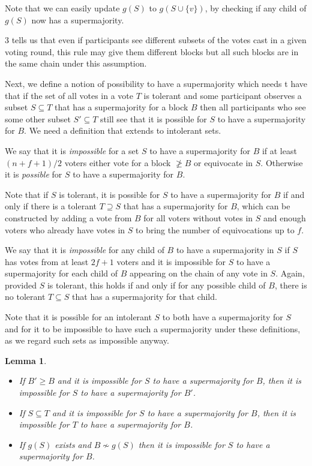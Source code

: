 \documentclass{article}
\newtheorem{lemma}[theorem]{Lemma}
\begin{document}
Note that we can easily update $g(S)$ to $g(S \cup \{v\})$, by checking if any child of $g(S)$ now has a supermajority.

3 tells us that even if participants see different subsets of the votes cast in a given voting round, this rule may give them different blocks but all such blocks are in the same chain under this assumption. 

Next, we define a notion of possibility to have a supermajority which needs t have that if the set of all votes in a vote $T$ is tolerant and some participant observes a subset $S \subseteq T$ that has a supermajority for a block $B$ then all participants who see some other subset $S' \subseteq T$ still see that it is possible for $S$ to have a supermajority for $B$. We need a definition that extends to intolerant sets.

We say that it is {\em impossible} for a set $S$ to have a supermajority for $B$ if at least $(n+f+1)/2$ voters either vote for a block $\not \geq B$ or equivocate in $S$. Otherwise it is {\em possible} for $S$ to have a supermajority for $B$.

Note that if $S$ is tolerant, it is possible for $S$ to have a supermajority for $B$ if and only if there is a tolerant $T \supseteq S$ that has a supermajority for $B$, which can be constructed by adding a vote from $B$ for all voters without votes in $S$ and enough voters who already have votes in $S$ to bring the number of equivocations up to $f$.

We say that it is {\em impossible} for any child of $B$ to have a supermajority in $S$ if $S$ has votes from at least $2f+1$ voters and it is impossible for $S$ to have a supermajority for each child of $B$ appearing on the chain of any vote in $S$.
Again, provided $S$ is tolerant, this holds if and only if for any possible child of $B$, there is no tolerant $T \subseteq S$ that has a supermajority for that child.

Note that it is possible for an intolerant $S$ to both have a supermajority for $S$ and for it to be impossible to have such a supermajority under these definitions, as we regard such sets as impossible anyway.

\begin{lemma} \label{lem:impossible}
\begin{itemize}
\item[(i)] If $B' \geq B$ and it is impossible for $S$ to have a supermajority for $B$, then it is impossible for $S$ to have a supermajority for $B'$.
\item[(ii)] If $S \subseteq T$ and it is impossible for $S$ to have a supermajority for $B$, then it is impossible for $T$ to have a supermajority for $B$.
\item[(iii)] If $g(S)$ exists and $B \nsim g(S)$ then it is impossible for $S$ to have a supermajority for $B$.
\end{itemize}
\end{lemma}
\end{document}
